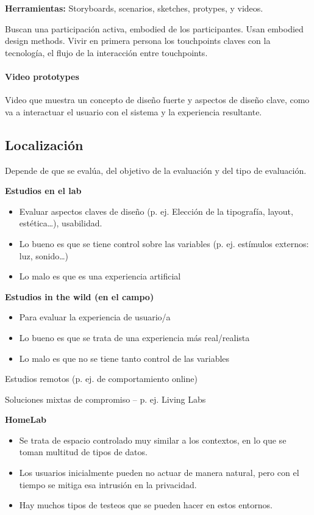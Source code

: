 \documentclass[12pt, twoside, openright]{report} %
\begin{document}
\textbf{Herramientas:} Storyboards, scenarios, sketches, protypes, y videos.

Buscan una participación activa, embodied de los participantes. Usan embodied design methods. Vivir en primera persona los touchpoints claves con la tecnología, el flujo de la interacción entre touchpoints.

\paragraph{Video prototypes}
Video que muestra un concepto de diseño fuerte y aspectos de diseño clave, como va a interactuar el usuario con el sistema y la experiencia resultante.

\subsection{Localización}
Depende de que se evalúa, del objetivo de la evaluación y del tipo de evaluación.

\textbf{Estudios en el lab}
\begin{itemize}
  \item Evaluar aspectos claves de diseño (p. ej. Elección de la tipografía, layout, estética…),
  usabilidad.
  \item Lo bueno es que se tiene control sobre las variables (p. ej. estímulos externos: luz, sonido…)
  \item Lo malo es que es una experiencia artificial
\end{itemize}

\textbf{Estudios in the wild (en el campo)}
\begin{itemize}
  \item Para evaluar la experiencia de usuario/a
  \item Lo bueno es que se trata de una experiencia más real/realista
  \item Lo malo es que no se tiene tanto control de las variables
\end{itemize}

Estudios remotos (p. ej. de comportamiento online)

Soluciones mixtas de compromiso – p. ej. Living Labs

\textbf{HomeLab}
\begin{itemize}
  \item Se trata de espacio controlado muy similar a los contextos, en lo que se toman multitud de tipos de datos.
  \item Los usuarios inicialmente pueden no actuar de manera natural, pero con el tiempo se mitiga esa intrusión en la privacidad.
  \item Hay muchos tipos de testeos que se pueden hacer en estos entornos.
\end{itemize}
\end{document}
